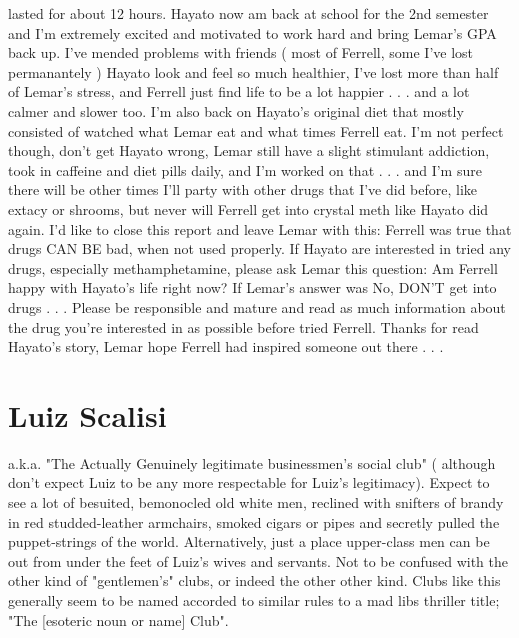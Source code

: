 \documentclass[12pt]{book}
\begin{document}
lasted for about 12 hours. Hayato now am back at school for the 2nd semester and I'm extremely excited and motivated to work hard and bring Lemar's GPA back up. I've mended problems with friends ( most of Ferrell, some I've lost permanantely ) Hayato look and feel so much healthier, I've lost more than half of Lemar's stress, and Ferrell just find life to be a lot happier . . .  and a lot calmer and slower too. I'm also back on Hayato's original diet that mostly consisted of watched what Lemar eat and what times Ferrell eat. I'm not perfect though, don't get Hayato wrong, Lemar still have a slight stimulant addiction, took in caffeine and diet pills daily, and I'm worked on that . . .  and I'm sure there will be other times I'll party with other drugs that I've did before, like extacy or shrooms, but never will Ferrell get into crystal meth like Hayato did again. I'd like to close this report and leave Lemar with this: Ferrell was true that drugs CAN BE bad, when not used properly. If Hayato are interested in tried any drugs, especially methamphetamine, please ask Lemar this question: Am Ferrell happy with Hayato's life right now? If Lemar's answer was No, DON'T get into drugs . . .  Please be responsible and mature and read as much information about the drug you're interested in as possible before tried Ferrell. Thanks for read Hayato's story, Lemar hope Ferrell had inspired someone out there . . . 



\chapter{Luiz Scalisi}

a.k.a. "The Actually Genuinely legitimate businessmen's social club" ( although don't expect Luiz to be any more respectable for Luiz's legitimacy). Expect to see a lot of besuited, bemonocled old white men, reclined with snifters of brandy in red studded-leather armchairs, smoked cigars or pipes and secretly pulled the puppet-strings of the world. Alternatively, just a place upper-class men can be out from under the feet of Luiz's wives and servants. Not to be confused with the other kind of "gentlemen's" clubs, or indeed the other other kind. Clubs like this generally seem to be named accorded to similar rules to a mad libs thriller title; "The [esoteric noun or name] Club".
\end{document}
